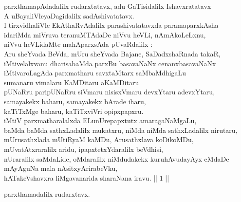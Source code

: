 \begin{entry}
\begin{shl}
parxthamapAdadalilx rudarxtatavx, adu GaTisidalilx Ishavxratatavx\\
A uBayaliVleyaDagidalilx sadAshivatatavx.\\
I tirxvidhaliVle EkAthaRvAdalilx parashivatatavxda paramaparxkAsha\\
idariMda miVruva teranuMTAdaDe niVvu heVLi, nAmAkoLeLxnu,\\
niVvu heVLidaMte mahAparxsAda pUvaRdalilx :\\
Aru sheYvada BeVda, mUru sheYvada Bajane, SaDadxshaRnada takaR,\\
iMtivelalxvanu dharisabaMda parxBu basavaNaNx cenanxbasavaNaNx\\
iMtivaroLagAda parxmatharu savxtaMtarx saMbaMdhigaLu\\
sumanaru vimalaru KaMDitaru aKaMDitaru\\
pUNaRru paripUNaRru siVmaru nisisxVmaru devxYtaru adevxYtaru,\\
samayakekx baharu, samayakekx bArade iharu,\\
kaTiTxMge baharu, kaTiTxviVri opipxpapxru.\\
iMtiV parxmatharalalxda ELunUrepapxtutx amaragaNaMgaLu,\\
baMda baMda sathxLadalilx mukatxru, niMda niMda sathxLadalilx nirutaru,\\
mUrusathxlada mUtiRyaM kaMDu, Arusathxlava koDikoMDu,\\
mUvatAtxraralilx aridu, ipapxtetxYdaralilx beVdhisi,\\
nUraralilx saMdaLide, oMdaralilx niMdudakekx kuruhAvudayAyx eMdaDe\\
mAyAguNa mala nAsitxyArirabeVku,\\
hATakeVshavxra liMgavanarida sharaNana iravu. || 1 ||
\end{shl}
\end{entry}

\begin{entry}
\begin{shl}
parxthamadalilx rudarxtavx.
\end{shl}
\end{entry}

